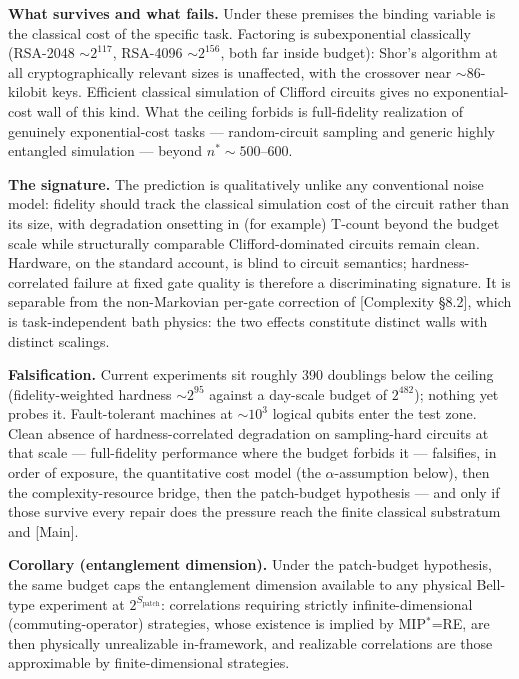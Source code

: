 \documentclass[
]{article}
\begin{document}
\textbf{What survives and what fails.} Under these premises the binding
variable is the classical cost of the specific task. Factoring is
subexponential classically (RSA-2048 \(\sim 2^{117}\), RSA-4096
\(\sim 2^{156}\), both far inside budget): Shor's algorithm at all
cryptographically relevant sizes is unaffected, with the crossover near
\(\sim 86\)-kilobit keys. Efficient classical simulation of Clifford
circuits gives no exponential-cost wall of this kind. What the ceiling
forbids is full-fidelity realization of genuinely exponential-cost tasks
--- random-circuit sampling and generic highly entangled simulation ---
beyond \(n^* \sim 500\)--\(600\).

\textbf{The signature.} The prediction is qualitatively unlike any
conventional noise model: fidelity should track the classical simulation
cost of the circuit rather than its size, with degradation onsetting in
(for example) T-count beyond the budget scale while structurally
comparable Clifford-dominated circuits remain clean. Hardware, on the
standard account, is blind to circuit semantics; hardness-correlated
failure at fixed gate quality is therefore a discriminating signature.
It is separable from the non-Markovian per-gate correction of
{[}Complexity §8.2{]}, which is task-independent bath physics: the two
effects constitute distinct walls with distinct scalings.

\textbf{Falsification.} Current experiments sit roughly 390 doublings
below the ceiling (fidelity-weighted hardness \(\sim 2^{95}\) against a
day-scale budget of \(2^{482}\)); nothing yet probes it. Fault-tolerant
machines at \(\sim 10^3\) logical qubits enter the test zone. Clean
absence of hardness-correlated degradation on sampling-hard circuits at
that scale --- full-fidelity performance where the budget forbids it ---
falsifies, in order of exposure, the quantitative cost model (the
\(\alpha\)-assumption below), then the complexity-resource bridge, then
the patch-budget hypothesis --- and only if those survive every repair
does the pressure reach the finite classical substratum and {[}Main{]}.

\textbf{Corollary (entanglement dimension).} Under the patch-budget
hypothesis, the same budget caps the entanglement dimension available to
any physical Bell-type experiment at \(2^{S_{\mathrm{patch}}}\):
correlations requiring strictly infinite-dimensional
(commuting-operator) strategies, whose existence is implied by
MIP\(^*\)=RE, are then physically unrealizable in-framework, and
realizable correlations are those approximable by finite-dimensional
strategies.
\end{document}
